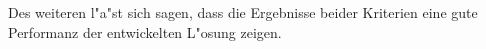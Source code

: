 
Des weiteren l"a"st sich sagen, dass die Ergebnisse beider Kriterien eine gute Performanz der entwickelten L"osung zeigen. 





